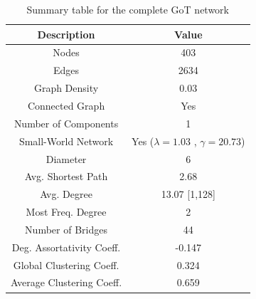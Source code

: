 \documentclass[10pt,twocolumn,letterpaper]{article}
\begin{document}
\begin{table}[!h]
    \centering
    \small
    \begin{tabular}{c|c}
        Description & Value  \\
        \hline
        Nodes & 403\\
        Edges & 2634 \\
        Graph Density & 0.03 \\
        Connected Graph & Yes \\
        Number of Components & 1 \\
        Small-World Network & Yes ($\lambda=1.03$ , $\gamma=20.73$) \\
        Diameter & 6 \\
        Avg. Shortest Path & 2.68 \\
        Avg. Degree & 13.07 [1,128] \\
        Most Freq. Degree & 2 \\
        Number of Bridges & 44 \\
        Deg. Assortativity Coeff. & -0.147\\
        Global Clustering Coeff. & 0.324 \\
        Average Clustering Coeff. & 0.659 \\
        \hline 
    \end{tabular}
    \vspace{0.2cm}
    \caption{Summary table for the complete GoT network}
    \label{tab:my_label}
\end{table} \\
\end{document}
